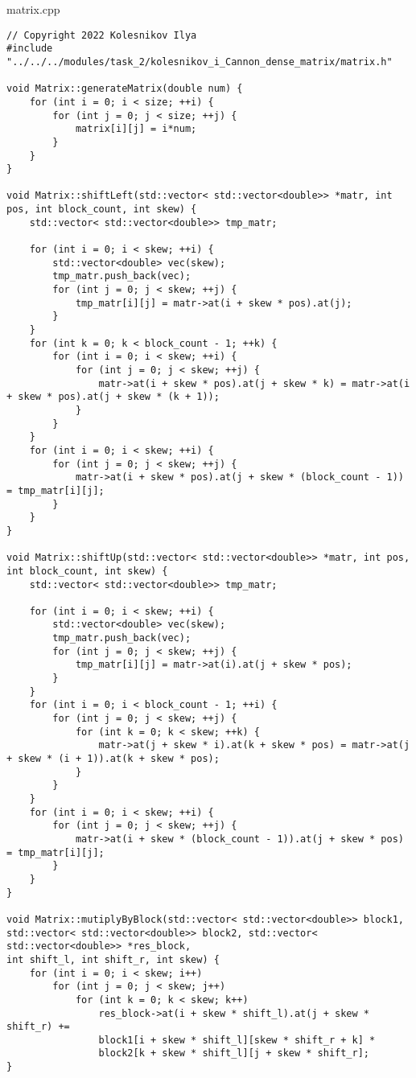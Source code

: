 \documentclass{report}
\begin{document}
matrix.cpp
\begin{lstlisting}
// Copyright 2022 Kolesnikov Ilya
#include "../../../modules/task_2/kolesnikov_i_Cannon_dense_matrix/matrix.h"

void Matrix::generateMatrix(double num) {
    for (int i = 0; i < size; ++i) {
        for (int j = 0; j < size; ++j) {
            matrix[i][j] = i*num;
        }
    }
}

void Matrix::shiftLeft(std::vector< std::vector<double>> *matr, int pos, int block_count, int skew) {
    std::vector< std::vector<double>> tmp_matr;

    for (int i = 0; i < skew; ++i) {
        std::vector<double> vec(skew);
        tmp_matr.push_back(vec);
        for (int j = 0; j < skew; ++j) {
            tmp_matr[i][j] = matr->at(i + skew * pos).at(j);
        }
    }
    for (int k = 0; k < block_count - 1; ++k) {
        for (int i = 0; i < skew; ++i) {
            for (int j = 0; j < skew; ++j) {
                matr->at(i + skew * pos).at(j + skew * k) = matr->at(i + skew * pos).at(j + skew * (k + 1));
            }
        }
    }
    for (int i = 0; i < skew; ++i) {
        for (int j = 0; j < skew; ++j) {
            matr->at(i + skew * pos).at(j + skew * (block_count - 1)) = tmp_matr[i][j];
        }
    }
}

void Matrix::shiftUp(std::vector< std::vector<double>> *matr, int pos, int block_count, int skew) {
    std::vector< std::vector<double>> tmp_matr;

    for (int i = 0; i < skew; ++i) {
        std::vector<double> vec(skew);
        tmp_matr.push_back(vec);
        for (int j = 0; j < skew; ++j) {
            tmp_matr[i][j] = matr->at(i).at(j + skew * pos);
        }
    }
    for (int i = 0; i < block_count - 1; ++i) {
        for (int j = 0; j < skew; ++j) {
            for (int k = 0; k < skew; ++k) {
                matr->at(j + skew * i).at(k + skew * pos) = matr->at(j + skew * (i + 1)).at(k + skew * pos);
            }
        }
    }
    for (int i = 0; i < skew; ++i) {
        for (int j = 0; j < skew; ++j) {
            matr->at(i + skew * (block_count - 1)).at(j + skew * pos) = tmp_matr[i][j];
        }
    }
}

void Matrix::mutiplyByBlock(std::vector< std::vector<double>> block1,
std::vector< std::vector<double>> block2, std::vector< std::vector<double>> *res_block,
int shift_l, int shift_r, int skew) {
    for (int i = 0; i < skew; i++)
        for (int j = 0; j < skew; j++)
            for (int k = 0; k < skew; k++)
                res_block->at(i + skew * shift_l).at(j + skew * shift_r) +=
                block1[i + skew * shift_l][skew * shift_r + k] *
                block2[k + skew * shift_l][j + skew * shift_r];
}


\end{lstlisting}
\end{document}
